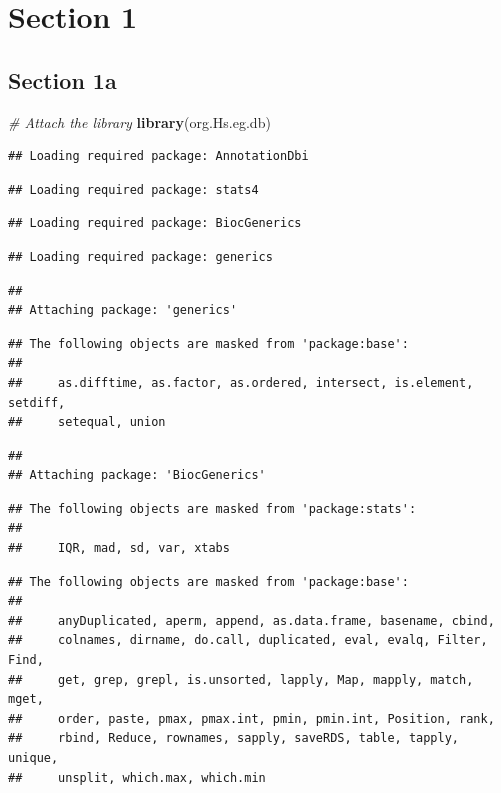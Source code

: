 \documentclass[
]{article}
\newenvironment{Shaded}{\begin{snugshade}}{\end{snugshade}}
\newcommand{\CommentTok}[1]{\textcolor[rgb]{0.56,0.35,0.01}{\textit{#1}}}
\newcommand{\FunctionTok}[1]{\textcolor[rgb]{0.13,0.29,0.53}{\textbf{#1}}}
\newcommand{\NormalTok}[1]{#1}
\begin{document}
\section{Section 1}\label{section-1}

\subsection{Section 1a}\label{section-1a}

\begin{Shaded}
\begin{Highlighting}[]
\CommentTok{\# Attach the library}
\FunctionTok{library}\NormalTok{(org.Hs.eg.db)}
\end{Highlighting}
\end{Shaded}

\begin{verbatim}
## Loading required package: AnnotationDbi
\end{verbatim}

\begin{verbatim}
## Loading required package: stats4
\end{verbatim}

\begin{verbatim}
## Loading required package: BiocGenerics
\end{verbatim}

\begin{verbatim}
## Loading required package: generics
\end{verbatim}

\begin{verbatim}
## 
## Attaching package: 'generics'
\end{verbatim}

\begin{verbatim}
## The following objects are masked from 'package:base':
## 
##     as.difftime, as.factor, as.ordered, intersect, is.element, setdiff,
##     setequal, union
\end{verbatim}

\begin{verbatim}
## 
## Attaching package: 'BiocGenerics'
\end{verbatim}

\begin{verbatim}
## The following objects are masked from 'package:stats':
## 
##     IQR, mad, sd, var, xtabs
\end{verbatim}

\begin{verbatim}
## The following objects are masked from 'package:base':
## 
##     anyDuplicated, aperm, append, as.data.frame, basename, cbind,
##     colnames, dirname, do.call, duplicated, eval, evalq, Filter, Find,
##     get, grep, grepl, is.unsorted, lapply, Map, mapply, match, mget,
##     order, paste, pmax, pmax.int, pmin, pmin.int, Position, rank,
##     rbind, Reduce, rownames, sapply, saveRDS, table, tapply, unique,
##     unsplit, which.max, which.min
\end{verbatim}
\end{document}
